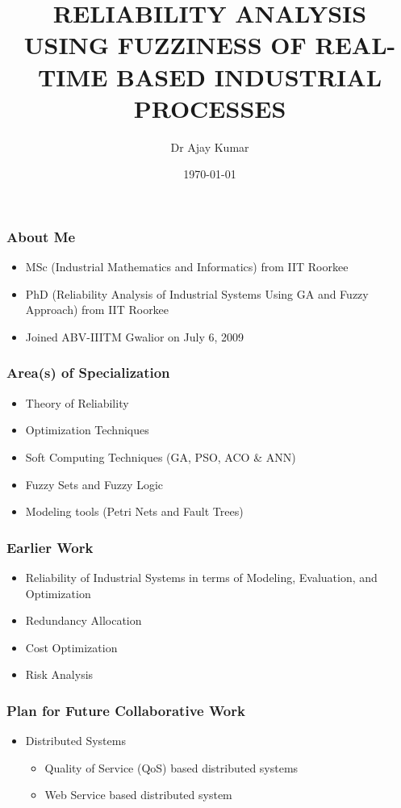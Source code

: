 \documentclass{beamer}
\title[IIT Roorkee]{RELIABILITY ANALYSIS USING FUZZINESS
OF REAL-TIME BASED INDUSTRIAL
PROCESSES}
\author{Dr Ajay Kumar}
\institute[]{
Associate Professor \\
ABV-IIITM Gwalior\\
Gwalior-474 010, MP, India
}
\date{\today}
\begin{document}
\frame{\titlepage}


\begin{frame}\frametitle{About Me}
\begin{itemize}
\item MSc (Industrial Mathematics and Informatics) from IIT Roorkee
\item PhD (Reliability Analysis of Industrial Systems Using GA and Fuzzy Approach)  from IIT Roorkee
\item Joined ABV-IIITM Gwalior on July 6, 2009
\end{itemize}
\end{frame}

\begin{frame}\frametitle{Area(s) of Specialization}
\begin{itemize}
\item Theory of Reliability
\item Optimization Techniques
\item Soft Computing Techniques (GA, PSO, ACO \& ANN)
\item Fuzzy Sets and Fuzzy Logic
\item Modeling tools  (Petri Nets and Fault Trees)
\end{itemize}
\end{frame}

\begin{frame}\frametitle{Earlier Work}
\begin{itemize}
\item Reliability of Industrial Systems in terms of Modeling, Evaluation, and Optimization
\item Redundancy Allocation
\item Cost Optimization
\item Risk Analysis
\end{itemize}
\end{frame}

\begin{frame}\frametitle{Plan for Future Collaborative Work}
\begin{itemize}
\item Distributed Systems
\begin{itemize}
  \item Quality of Service (QoS) based distributed systems
  \item Web Service based distributed system
\end{itemize}
\end{itemize}
\end{frame}
\end{document}
